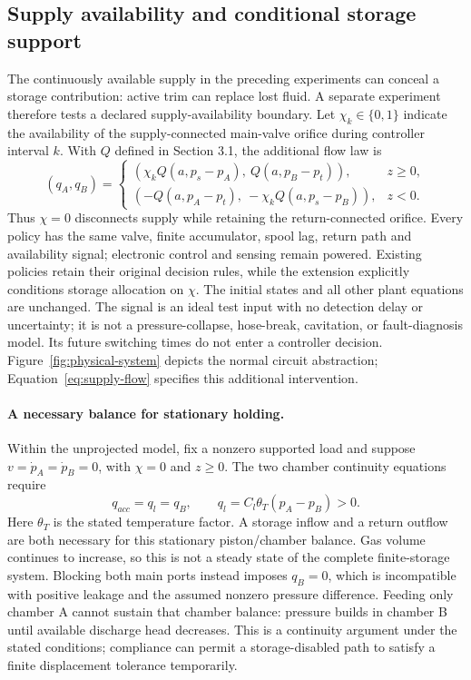 \subsection{Supply availability and conditional storage support}\label{sec:supply-method}
The continuously available supply in the preceding experiments can conceal a storage contribution: active trim can replace lost fluid. A separate experiment therefore tests a declared supply-availability boundary. Let $\chi_k\in\{0,1\}$ indicate the availability of the supply-connected main-valve orifice during controller interval $k$. With $Q$ defined in Section 3.1, the additional flow law is
\begin{equation}
 (q_A,q_B)=
 \begin{cases}
 (\chi_k Q(a,p_s-p_A),\ Q(a,p_B-p_t)),&z\ge0,\\
 (-Q(a,p_A-p_t),\ -\chi_k Q(a,p_s-p_B)),&z<0.
 \end{cases}\label{eq:supply-flow}
\end{equation}
Thus $\chi=0$ disconnects supply while retaining the return-connected orifice. Every policy has the same valve, finite accumulator, spool lag, return path and availability signal; electronic control and sensing remain powered. Existing policies retain their original decision rules, while the extension explicitly conditions storage allocation on $\chi$. The initial states and all other plant equations are unchanged. The signal is an ideal test input with no detection delay or uncertainty; it is not a pressure-collapse, hose-break, cavitation, or fault-diagnosis model. Its future switching times do not enter a controller decision. Figure~\ref{fig:physical-system} depicts the normal circuit abstraction; Equation~\eqref{eq:supply-flow} specifies this additional intervention.

\paragraph{A necessary balance for stationary holding.}
Within the unprojected model, fix a nonzero supported load and suppose $v=\dot p_A=\dot p_B=0$, with $\chi=0$ and $z\ge0$. The two chamber continuity equations require
\begin{equation}
 q_{acc}=q_l=q_B,
 \qquad q_l=C_l\theta_T(p_A-p_B)>0.\label{eq:reserve-balance}
\end{equation}
Here $\theta_T$ is the stated temperature factor. A storage inflow and a return outflow are both necessary for this stationary piston/chamber balance. Gas volume continues to increase, so this is not a steady state of the complete finite-storage system. Blocking both main ports instead imposes $q_B=0$, which is incompatible with positive leakage and the assumed nonzero pressure difference. Feeding only chamber A cannot sustain that chamber balance: pressure builds in chamber B until available discharge head decreases. This is a continuity argument under the stated conditions; compliance can permit a storage-disabled path to satisfy a finite displacement tolerance temporarily.

